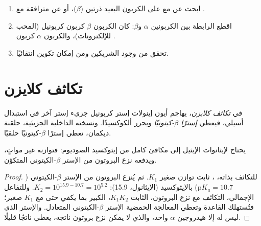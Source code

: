 \begin{method}\label{met:b2:enolates-aldol:aldol-recognition}
\begin{enumerate}
  \item ابحث عن  مع  على الكربون البعيد ذرتين ($\beta$)، أو عن 
        مترافقة مع .
  \item اقطع الرابطة بين الكربونين $\alpha$ و$\beta$: كان الكربون $\beta$ كربون كربونيل (المحب
        للإلكترونات)، والكربون $\alpha$ كربون .
  \item تحقق من وجود الشريكين ومن إمكان تكوين  انتقائيًا.
\end{enumerate}
\end{method}

\section{تكاثف كلايزن}

\begin{definition}\label{def:b2:enolates-aldol:claisen}
في \emph{تكاثف كلايزن}، يهاجم أيون إينولات إستر
كربونيل جزيء إستر آخر في استبدال أسيلي، فيعطي \emph{إسترًا $\beta$-كيتونيًا}
ويحرر ألكوكسيدًا. ونسخته الداخلية الجزيئية، حلقنة ديكمان،
تعطي إسترًا $\beta$-كيتونيًا حلقيًا.
\end{definition}

\begin{proposition}\label{prop:b2:enolates-aldol:claisen-drive}
يحتاج  لإيثانوات الإيثيل إلى مكافئ كامل من إيثوكسيد الصوديوم: فتوازنه
غير مواتٍ، ويدفعه نزع البروتون من الإستر $\beta$-الكيتوني المتكوّن.
\end{proposition}

\begin{proof}
للتكاثف بذاته، ، ثابت توازن صغير
$K_1$. ثم يُنزع البروتون من الإستر $\beta$-الكيتوني ($\mathrm pK_a = 10.7$) بالإيثوكسيد (الإيثانول، 15.9):
$K_2 = 10^{15.9 - 10.7} = 10^{5.2}$. وللتفاعل الإجمالي، التكاثف مع نزع البروتون، الثابت
$K_1K_2$، الكبير بما يكفي حتى مع $K_1$ صغير؛ فتُستهلك القاعدة وتعطي المعالجة الحمضية الإستر
$\beta$-الكيتوني المتعادل. والإستر الذي ليس له إلا هيدروجين $\alpha$ واحد، والذي لا يمكن نزع بروتون ناتجه، يعطي
ناتجًا قليلًا.
\end{proof}

